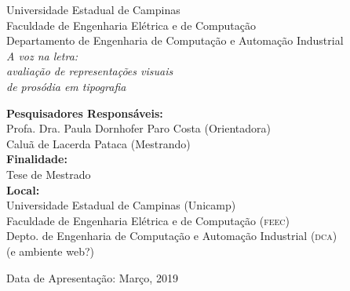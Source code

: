 \documentclass[a4paper,11pt,titlepage,singlespacing]{article}
\begin{document}
\begin{titlepage}
	\begin{center}
		\large{Universidade Estadual de Campinas}\\
		\large{Faculdade de Engenharia Elétrica e de Computação}\\ 
		\large{Departamento de Engenharia de Computação e Automação Industrial}\\ 
        \vspace{115pt}
        \huge\textit{A voz na letra: \\ avaliação de representações visuais \\ de prosódia em tipografia}\\
        
	\end{center}
	\vspace{95pt}
	\begin{flushleft}
        \large{\textbf{Pesquisadores Responsáveis:}}\\
        Profa. Dra. Paula Dornhofer Paro Costa (Orientadora)\\	
        Caluã de Lacerda Pataca (Mestrando)\\
        
        
        \vspace{15pt}
        \large{\textbf{Finalidade:} \\Tese de Mestrado}\\
        \vspace{15pt}
        \large{\textbf{Local:} \\
        Universidade Estadual de Campinas (Unicamp)
        \\Faculdade de Engenharia Elétrica e de Computação (\textsc{feec})}\\
        Depto. de Engenharia de Computação e Automação Industrial (\textsc{dca})\\
        (e ambiente web?)
        \vspace{15pt}        
	\end{flushleft}
	\vspace{3,5cm}
	\begin{center}
	 Data de Apresentação: Março, 2019
	\end{center}


\end{titlepage}
\end{document}
